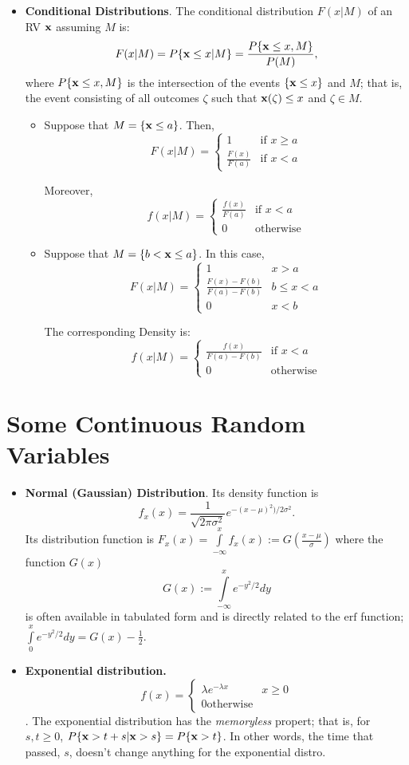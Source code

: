 \documentclass[a4paper, oneside]{book}
\begin{document}
\begin{itemize}
\item \textbf{Conditional Distributions}. The conditional distribution $F(x|M)$ of an RV $\mathbf x$ assuming $M$ is: 
$$F(x|M)=P\{\mathbf x \le x |M \} = \frac{P\{\mathbf x \le x, M\}}{P(M)},$$
where $P\{\mathbf x \le x, M\}$ is the intersection of the events $\{\mathbf x \le x\}$ and $M$; that is, the event consisting of all outcomes $\zeta$ such that $\mathbf x(\zeta)\le x$ and $\zeta \in M$. 
	\begin{itemize}
	\item Suppose that $M = \{\mathbf x \le a\}$. Then, 
	$$F (x | M) = \begin{cases}1& \text{if}\,\, x\ge a \\
	 \frac{F(x)}{F(a)} & \text{if}\,\, x< a\end{cases}$$
	 
	 Moreover, $$f(x|M) = \begin{cases}\frac{f(x)}{F(a)} & \text{if}\,\, x<a \\ 0 & \text{otherwise}\end{cases}$$
	\item Suppose that $M = \{b < \mathbf x \le a\}$. In this case,
	$$
	F(x|M) = \begin{cases}
	1  & x>a  \\ 
	\frac{F(x)-F(b)}{F(a)-F(b)} & b\le x < a \\
	0 & x < b
	\end{cases}
	$$
	
	The corresponding Density is: $$f(x|M) = \begin{cases}\frac{f(x)}{F(a)-F(b)} & \text{if}\,\, x<a \\ 0 & \text{otherwise}\end{cases}$$
	\end{itemize}

\end{itemize}


\section{Some Continuous Random Variables}
\begin{itemize}
\item \textbf{Normal (Gaussian) Distribution}. Its density function is$$f_x(x) = \frac{1}{\sqrt{2 \pi \sigma^2}}e^{-(x-\mu)^2)/2\sigma^2}.$$
Its distribution function is $F_x(x) = \int\limits_{-\infty}^x  f_x(x) := G(\frac{x-\mu}{\sigma})$ where the function $G(x)$%
$$G(x) := \int\limits_{-\infty}^x e^{-y^2/2}dy$$  is often available in tabulated form and is directly related to the $\text{erf}$ function; $\int\limits_{0}^x e^{-y^2/2}dy  = G(x) - \frac{1}{2}.$

\item \textbf{Exponential distribution.} $$f(x) = \begin{cases} \lambda e^{-\lambda x}  & x\ge 0 \\ 0 \text{otherwise} \end{cases}$$.
The exponential distribution has the \textit{memoryless} propert; that is, for $s,t\ge 0$, $P\{\mathbf x> t+s | \mathbf x >s\} =P \{\mathbf x >t\} $. In other words, the time that passed, $s$, doesn't change anything for the exponential distro. 
\end{itemize}
\end{document}
